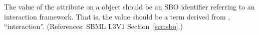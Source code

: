 The value of the  attribute on a \Reaction object should be
an SBO identifier referring to an interaction framework.  That is, the
value should be a term derived from \sbointeractionID, ``interaction''.
(References: SBML L3V1 Section~\ref{sec:sbo}.)
